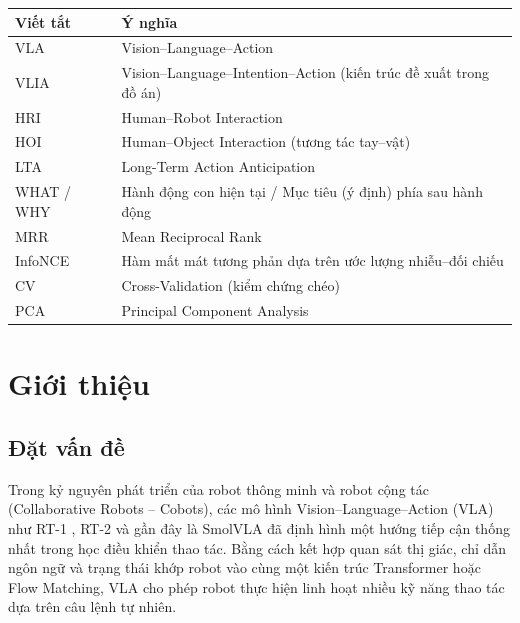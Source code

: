 \documentclass[12pt,a4paper]{report}
\begin{document}
\begin{tabular}{@{}p{3.2cm}p{11.5cm}@{}}
    \toprule
    \textbf{Viết tắt} & \textbf{Ý nghĩa} \\
    \midrule
    VLA & Vision--Language--Action \\
    VLIA & Vision--Language--Intention--Action (kiến trúc đề xuất trong đồ án) \\
    HRI & Human--Robot Interaction \\
    HOI & Human--Object Interaction (tương tác tay--vật) \\
    LTA & Long-Term Action Anticipation \\
    WHAT / WHY & Hành động con hiện tại / Mục tiêu (ý định) phía sau hành động \\
    MRR & Mean Reciprocal Rank \\
    InfoNCE & Hàm mất mát tương phản dựa trên ước lượng nhiễu--đối chiếu \\
    CV & Cross-Validation (kiểm chứng chéo) \\
    PCA & Principal Component Analysis \\
    \bottomrule
\end{tabular}

\clearpage
{}

\chapter{Giới thiệu}
\label{chap:introduction}

\section{Đặt vấn đề}

Trong kỷ nguyên phát triển của robot thông minh và robot cộng tác (Collaborative Robots -- Cobots), các mô hình Vision--Language--Action (VLA) như RT-1 \citep{brohan2022rt1}, RT-2 \citep{zitkovich2023rt2} và gần đây là SmolVLA \citep{shukor2025smolvla} đã định hình một hướng tiếp cận thống nhất trong học điều khiển thao tác. Bằng cách kết hợp quan sát thị giác, chỉ dẫn ngôn ngữ và trạng thái khớp robot vào cùng một kiến trúc Transformer hoặc Flow Matching, VLA cho phép robot thực hiện linh hoạt nhiều kỹ năng thao tác dựa trên câu lệnh tự nhiên.
\end{document}
